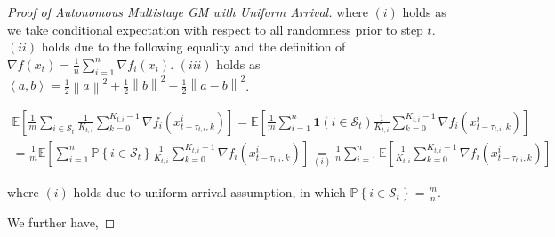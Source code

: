 \begin{proof}[Proof of Autonomous Multistage GM with Uniform Arrival]
where $(i)$ holds as we take conditional expectation with respect to all randomness prior to step $t$. $(ii)$ holds due to the following equality and the definition of $\nabla f(x_t)=\frac{1}{n}\sum_{i=1}^n \nabla f_i(x_t)$. $(iii)$ holds as $\left\langle a, b \right\rangle = \frac{1}{2} \left\| a \right\|^2 + \frac{1}{2} \left\| b \right\|^2 - \frac{1}{2} \left\| a - b \right\|^2 $.

\begin{equation}
\begin{gathered}
\mathbb{E}\left[\frac{1}{m} \sum_{i\in\mathcal{S}_t} \frac{1}{K_{t,i}} \sum_{k=0}^{K_{t,i}-1}\nabla f_i(x_{t-\tau_{t,i},k}^i)\right] = \mathbb{E}\left[ \frac{1}{m}\sum_{i=1}^n \mathbf{1}\left(i\in\mathcal{S}_t\right) \frac{1}{K_{t,i}} \sum_{k=0}^{K_{t,i}-1}\nabla f_i(x_{t-\tau_{t,i},k}^i)  \right] \\
= \frac{1}{m} \mathbb{E}\left[ \sum_{i=1}^n \mathbb{P}\left\{i\in\mathcal{S}_t\right\} \frac{1}{K_{t,i}} \sum_{k=0}^{K_{t,i}-1}\nabla f_i(x_{t-\tau_{t,i},k}^i) \right] \underset{(i)}{=} \frac{1}{n}\sum_{i=1}^n \mathbb{E}\left[ \frac{1}{K_{t,i}} \sum_{k=0}^{K_{t,i}-1}\nabla f_i(x_{t-\tau_{t,i},k}^i) \right]
\end{gathered}\nonumber
\end{equation}

where $(i)$ holds due to uniform arrival assumption, in which $\mathbb{P}\left\{i\in\mathcal{S}_t\right\}=\frac{m}{n}$.

We further have, 



\end{proof}

